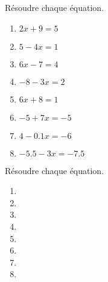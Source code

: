 \begin{exercice*}
    Résoudre chaque équation.
    \begin{multicols}{2}
        \begin{enumerate}
            \item $2x+9=5$
            \item $5-4x=1$
            \item $6x-7=4$
            \item $-8-3x=2$
            \item $6x+8=1$
            \item $-5+7x=-5$
            \item $4-\num{0.1}x=-6$
            \item $\num{-5.5}-3x=\num{-7.5}$
        \end{enumerate}
    \end{multicols}
\end{exercice*}
\begin{corrige}
    Résoudre chaque équation.
    \hspace*{-5mm}\begin{minipage}{\linewidth}
    {\setlength{\columnseprule}{0pt}
    \begin{multicols}{2}        
        \begin{enumerate}
            \item {}
            \item {}
            \item {}
            \item {}
            \item {}
            \item {}
            \item {}
            \item {}
        \end{enumerate}
    \end{multicols}
    }
    \end{minipage}
\end{corrige}

